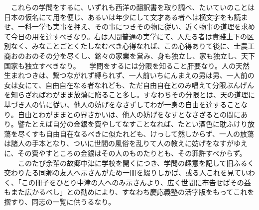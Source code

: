 \documentclass{ltjsarticle}
\begin{document}
\begin{breakbox}
　これらの学問をするに、いずれも西洋の翻訳書を取り調べ、たいていのことは日本の仮名にて用を便じ、あるいは年少にして文才ある者へは横文字をも読ませ、一科一学も実事を押え、その事につきその物に従い、近く物事の道理を求めて今日の用を達すべきなり。右は人間普通の実学にて、人たる者は貴賤上下の区別なく、みなことごとくたしなむべき心得なれば、この心得ありて後に、士農工商おのおのその分を尽くし、銘々の家業を営み、身も独立し、家も独立し、天下国家も独立すべきなり。
　学問をするには分限を知ること肝要なり。人の天然生まれつきは、繋つながれず縛られず、一人前いちにんまえの男は男、一人前の女は女にて、自由自在なる者なれども、ただ自由自在とのみ唱えて分限ぶんげんを知らざればわがまま放蕩に陥ること多し。すなわちその分限とは、天の道理に基づき人の情に従い、他人の妨げをなさずしてわが一身の自由を達することなり。自由とわがままとの界さかいは、他人の妨げをなすとなさざるとの間にあり。譬たとえば自分の金銀を費やしてなすことなれば、たとい酒色に耽ふけり放蕩を尽くすも自由自在なるべきに似たれども、けっして然しからず、一人の放蕩は諸人の手本となり、ついに世間の風俗を乱りて人の教えに妨げをなすがゆえに、その費やすところの金銀はその人のものたりとも、その罪許すべからず。
　　このたび余輩の故郷中津に学校を開くにつき、学問の趣意を記して旧ふるく交わりたる同郷の友人へ示さんがため一冊を綴りしかば、或る人これを見ていわく、「この冊子をひとり中津の人へのみ示さんより、広く世間に布告せばその益もまた広かるべし」との勧めにより、すなわち慶応義塾の活字版をもってこれを摺すり、同志の一覧に供うるなり。
\end{breakbox}
\end{document}

